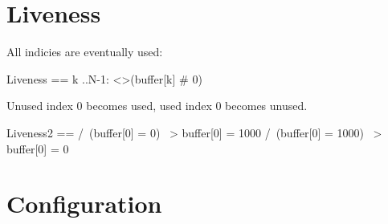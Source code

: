 \section{Liveness}

All indicies are eventually used:

\begin{tla}
    Liveness ==
    \A k ..N-1:
    <>(buffer[k] # 0)
\end{tla}
\begin{tlatex}
%
%
%
\end{tlatex}

Unused index 0 becomes used, used index 0 becomes unused.
\begin{tla}
    Liveness2 ==
    /\ (buffer[0] = 0) ~> buffer[0] = 1000
    /\ (buffer[0] = 1000) ~> buffer[0] = 0
\end{tla}
\begin{tlatex}
%
\end{tlatex}

\section{Configuration}

% 
